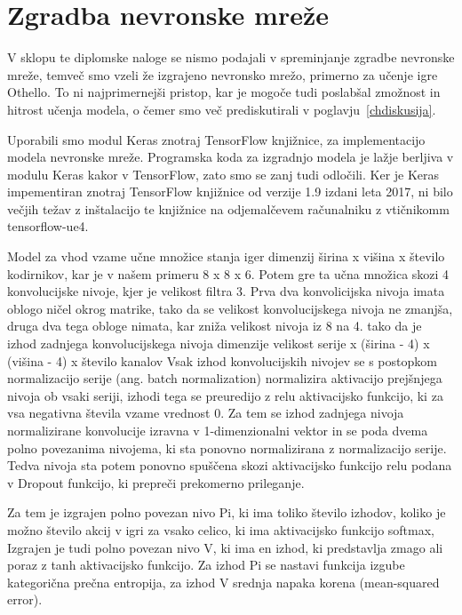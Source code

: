 \documentclass[a4paper, 12pt]{book}
\begin{document}
\section{Zgradba nevronske mreže}

V sklopu te diplomske naloge se nismo podajali v spreminjanje zgradbe nevronske mreže, temveč smo vzeli že izgrajeno nevronsko mrežo, primerno za učenje igre Othello.
To ni najprimernejši pristop, kar je mogoče tudi poslabšal zmožnost in hitrost učenja modela, o čemer smo več prediskutirali v poglavju~\ref{chdiskusija}.

Uporabili smo modul Keras znotraj TensorFlow knjižnice, za implementacijo modela nevronske mreže.
Programska koda za izgradnjo modela je lažje berljiva v modulu Keras kakor v TensorFlow, zato smo se zanj tudi odločili.
Ker je Keras impementiran znotraj TensorFlow knjižnice od verzije 1.9 izdani leta 2017, ni bilo večjih težav z inštalacijo te knjižnice na odjemalčevem računalniku z vtičnikomm tensorflow-ue4.

Model za vhod vzame učne množice stanja iger dimenzij širina x višina x število kodirnikov, kar je v našem primeru 8 x 8 x 6.
Potem gre ta učna množica skozi 4 konvolucijske nivoje, kjer je velikost filtra 3.
Prva dva konvolicijska nivoja imata oblogo ničel okrog matrike, tako da se velikost konvolucijskega nivoja ne zmanjša, druga dva tega obloge nimata, kar zniža velikost nivoja iz 8 na 4.
tako da je izhod zadnjega konvolucijskega nivoja dimenzije velikost serije  x (širina - 4) x (višina - 4) x število kanalov
Vsak izhod konvolucijskih nivojev se s postopkom normalizacijo serije (ang. batch normalization) normalizira aktivacijo prejšnjega nivoja ob vsaki seriji, izhodi tega se preuredijo z relu aktivacijsko funkcijo, ki za vsa negativna števila vzame vrednost 0.
Za tem se izhod zadnjega nivoja normalizirane konvolucije izravna v 1-dimenzionalni vektor in se poda dvema polno povezanima nivojema, ki sta ponovno normalizirana z normalizacijo serije.
Tedva nivoja sta potem ponovno spuščena skozi aktivacijsko funkcijo relu podana v  Dropout funkcijo, ki prepreči prekomerno prileganje.

Za tem je izgrajen polno povezan nivo Pi, ki ima toliko število izhodov, koliko je možno število akcij v igri za vsako celico, ki ima aktivacijsko funkcijo softmax,
Izgrajen je tudi polno povezan nivo V, ki ima en izhod, ki predstavlja zmago ali poraz z tanh aktivacijsko funkcijo.
Za izhod Pi se nastavi funkcija izgube kategorična prečna entropija, za izhod V  srednja napaka korena (mean-squared error).
\end{document}
